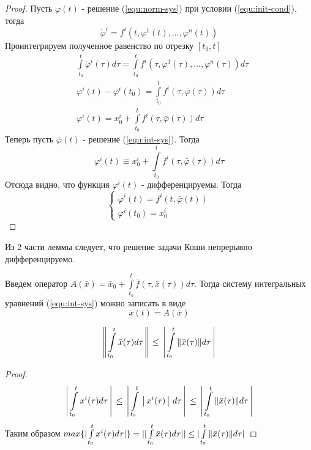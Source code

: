 \begin{proof}
	Пусть $\varphi(t)$ - решение (\ref{equ:norm-sys}) при условии (\ref{equ:init-cond}), тогда
	\[
		\dot{\varphi}^i = f^i(t, \varphi^1(t), \dots, \varphi^n(t))
	\]
	Проинтегрируем полученное равенство по отрезку $[t_0, t]$
	\begin{align*}
		&\int\limits_{t_0}^t \dot{\varphi}^i(\tau)d\tau = \int\limits_{t_0}^t f^i(\tau, \varphi^1(\tau), \dots, \varphi^n(\tau)) d\tau \\
		&\varphi^i(t) - \varphi^i(t_0) = \int\limits_{t_0}^t f^i(\tau, \bar\varphi(\tau))d\tau \\
		&\varphi^i(t) = x_0^i + \int\limits_{t_0}^t f^i(\tau, \bar\varphi(\tau))d\tau
	\end{align*}
	Теперь пусть $\bar{\varphi}(t)$ - решение (\ref{equ:int-sys}). Тогда
	\[
		\varphi^i(t) \equiv x_0^i + \int\limits_{t_0}^t f^i(\tau, \bar{\varphi}(\tau))d\tau
	\]
	Отсюда видно, что функция $\varphi^i(t)$ - дифференцируемы. Тогда
	\begin{equation}
	\begin{cases*}
		\dot{\varphi}^i(t) = f^i(t, \bar{\varphi}(t)) \\
		\varphi^i(t_0) = x_0^i
	\end{cases*}
	\end{equation}
\end{proof}

\begin{corollary}
	Из 2 части леммы следует, что решение задачи Коши непрерывно дифференцируемо.
\end{corollary}

Введем оператор $A(\bar{x}) = \bar{x}_0 + \int\limits_{t_0}^t \bar{f}(\tau, \bar{x}(\tau)) d\tau$. Тогда систему интегральных уравнений (\ref{equ:int-sys}) можно записать в виде 
\begin{equation}
	\label{equ:altern}
	\bar{x}(t) = A(\bar{x})
\end{equation}

\begin{lemma}
	\[
	\left\Arrowvert \int\limits_{t_0}^t\bar{x}(\tau)d\tau \right\Arrowvert \le \left\arrowvert \int\limits_{t_0}^t \Arrowvert \bar{x}(\tau)\Arrowvert d\tau \right\arrowvert
	\]
\end{lemma}

\begin{proof}
	\begin{equation}
		\left\arrowvert \int\limits_{t_0}^t x^i(\tau)d\tau \right\arrowvert \le\left\arrowvert \int\limits_{t_0}^t \left\arrowvert x^i(\tau) \right\arrowvert d\tau\right\arrowvert \le \left\arrowvert \int\limits_{t_0}^t \Arrowvert \bar{x}(\tau)\Arrowvert d\tau \right\arrowvert
	\end{equation}
	Таким образом $max\{|\int\limits_{t_0}^t x^i(\tau)d\tau|\} = || \int\limits_{t_0}^t \bar{x}(\tau)d\tau || \le \arrowvert \int\limits_{t_0}^t \Arrowvert \bar{x}(\tau)\Arrowvert d\tau \arrowvert$
\end{proof}

